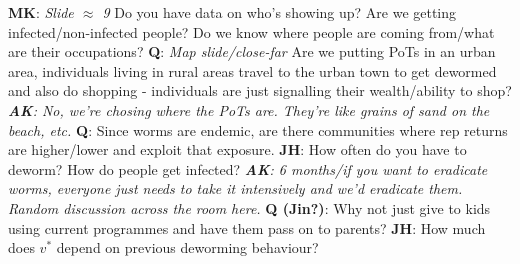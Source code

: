 \documentclass{article}
\begin{document}
\textbf{MK}: \emph{Slide $\approx$ 9} Do you have data on who's showing up? Are we getting 
infected/non-infected people? Do we know where people are coming from/what are their occupations?
\newline
\newline
\textbf{Q}: \emph{Map slide/close-far} Are we putting PoTs in an urban area, individuals living 
in rural areas travel to the urban town to get dewormed and also do shopping - individuals are 
just signalling their wealth/ability to shop?
\emph{
    \textbf{AK}: No, we're chosing where the PoTs are. They're like grains of sand on the beach, etc.
}
\newline
\newline
\textbf{Q}: Since worms are endemic, are there communities where rep returns are higher/lower 
and exploit that exposure.
\newline
\newline
\textbf{JH}: How often do you have to deworm? How do people get infected? 
\emph{
    \textbf{AK}: 6 months/if you want to eradicate worms, everyone just needs to take it intensively and 
    we'd eradicate them. Random discussion across the room here.
}
\newline
\newline
\textbf{Q (Jin?)}: Why not just give to kids using current programmes and have them 
pass on to parents?
\newline
\newline
\textbf{JH}: How much does $v^*$ depend on previous deworming behaviour?
\end{document}
